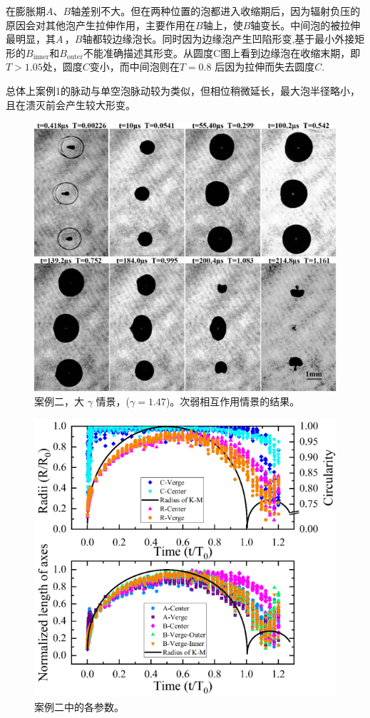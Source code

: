 在膨胀期$A$、$B$轴差别不大。但在两种位置的泡都进入收缩期后，因为辐射负压的原因会对其他泡产生拉伸作用，主要作用在$B$轴上，使$B$轴变长。中间泡的被拉伸最明显，其$A\,$，$B$轴都较边缘泡长。同时因为边缘泡产生凹陷形变,基于最小外接矩形的$B_\mathrm{inner}$和$B_\mathrm{outer}$不能准确描述其形变。从圆度C图上看到边缘泡在收缩末期，即$T>1.05$处，圆度$C$变小，而中间泡则在$T=0.8$
后因为拉伸而失去圆度$C$.

总体上案例1的脉动与单空泡脉动较为类似，但相位稍微延长，最大泡半径略小，且在溃灭前会产生较大形变。

\begin{figure}[H]
    \centering
    \includegraphics[width=0.7\linewidth]{img/fig4.5.png}
    \caption{案例二，大
$\gamma$ 情景，($\gamma=1.47$)。次弱相互作用情景的结果。}
    \label{fig:4.5}
\end{figure}


\begin{figure}[H]
    \centering
    \includegraphics[width=0.7\linewidth]{img/fig4.6.png}
    \caption{案例二中的各参数。}
    \label{fig:4.6}
\end{figure}



